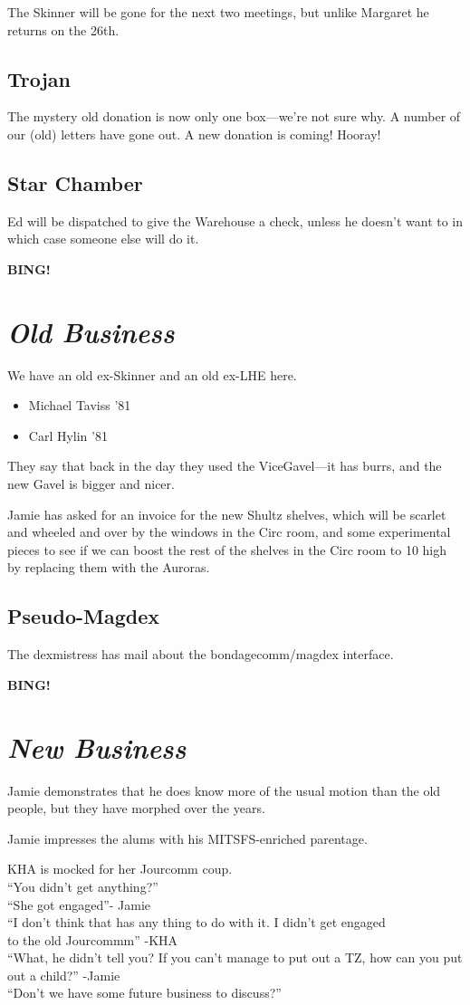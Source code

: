 \documentclass[10pt]{article}
\newcommand{\bing}{{\bf BING!} }
\newcommand{\goto}[1]{\bing \vskip 12pt \section*{{\em{#1}}}}
\begin{document}
The Skinner will be gone for the next two meetings, but unlike
Margaret he returns on the 26th. 


\subsection*{Trojan}
The mystery old donation is now only one box---we're not sure why.
A number of our (old) letters have gone out.
A new donation is coming! Hooray!


\subsection*{Star Chamber}
Ed will be dispatched to give the Warehouse a check, unless he doesn't
want to in which case someone else will do it.


\goto{Old Business}
We have an old ex-Skinner and an old ex-LHE here.
\begin{itemize}
\item Michael Taviss '81
\item Carl Hylin '81
\end{itemize}
They say that back in the day they used the ViceGavel---it has burrs,
and the new Gavel is bigger and nicer.
  
Jamie has asked for an invoice for the new Shultz shelves, which will
be scarlet and wheeled and over by the windows in the Circ room, and
some experimental pieces to see if we can boost the rest of the shelves
in the Circ room to 10 high by replacing them with the Auroras.

\subsection{Pseudo-Magdex}
 The dexmistress has mail about the bondagecomm/magdex interface.

\goto{New Business}
Jamie demonstrates that he does know more of the usual motion than the
old people, but they have morphed over the years.

Jamie impresses the alums with his MITSFS-enriched parentage.

KHA is mocked for her Jourcomm coup.  \\
``You didn't get anything?''\\
``She got engaged''- Jamie\\
``I don't think that has any thing to do with it. I didn't get engaged\\
to the old Jourcommm'' -KHA\\
``What, he didn't tell you? If you can't manage to put out a TZ, how
can you put out a child?'' -Jamie\\
``Don't we have some future business to discuss?''
\end{document}
